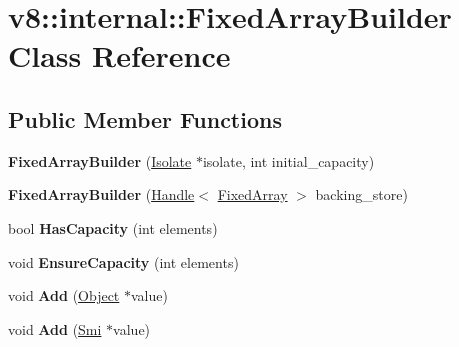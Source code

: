 \hypertarget{classv8_1_1internal_1_1_fixed_array_builder}{}\section{v8\+:\+:internal\+:\+:Fixed\+Array\+Builder Class Reference}
\label{classv8_1_1internal_1_1_fixed_array_builder}
\subsection*{Public Member Functions}
\begin{DoxyCompactItemize}
\item 
\hypertarget{classv8_1_1internal_1_1_fixed_array_builder_a462566e1ff69ae42b59bc374a2692147}{}{\bfseries Fixed\+Array\+Builder} (\hyperlink{classv8_1_1internal_1_1_isolate}{Isolate} $\ast$isolate, int initial\+\_\+capacity)\label{classv8_1_1internal_1_1_fixed_array_builder_a462566e1ff69ae42b59bc374a2692147}

\item 
\hypertarget{classv8_1_1internal_1_1_fixed_array_builder_a6a1999869a5363ea5ba6b8586b2aeb1b}{}{\bfseries Fixed\+Array\+Builder} (\hyperlink{classv8_1_1internal_1_1_handle}{Handle}$<$ \hyperlink{classv8_1_1internal_1_1_fixed_array}{Fixed\+Array} $>$ backing\+\_\+store)\label{classv8_1_1internal_1_1_fixed_array_builder_a6a1999869a5363ea5ba6b8586b2aeb1b}

\item 
\hypertarget{classv8_1_1internal_1_1_fixed_array_builder_aa610027ce4b3aca54fdb05cbb9492aed}{}bool {\bfseries Has\+Capacity} (int elements)\label{classv8_1_1internal_1_1_fixed_array_builder_aa610027ce4b3aca54fdb05cbb9492aed}

\item 
\hypertarget{classv8_1_1internal_1_1_fixed_array_builder_aee1eb4bc66302d781316a09ca53d796f}{}void {\bfseries Ensure\+Capacity} (int elements)\label{classv8_1_1internal_1_1_fixed_array_builder_aee1eb4bc66302d781316a09ca53d796f}

\item 
\hypertarget{classv8_1_1internal_1_1_fixed_array_builder_afbadceee85a2b4bbe7db9a5479f92bc1}{}void {\bfseries Add} (\hyperlink{classv8_1_1internal_1_1_object}{Object} $\ast$value)\label{classv8_1_1internal_1_1_fixed_array_builder_afbadceee85a2b4bbe7db9a5479f92bc1}

\item 
\hypertarget{classv8_1_1internal_1_1_fixed_array_builder_a48ba6549ebfdb7e2163aa21fb901f08d}{}void {\bfseries Add} (\hyperlink{classv8_1_1internal_1_1_smi}{Smi} $\ast$value)\label{classv8_1_1internal_1_1_fixed_array_builder_a48ba6549ebfdb7e2163aa21fb901f08d}


\end{DoxyCompactItemize}
